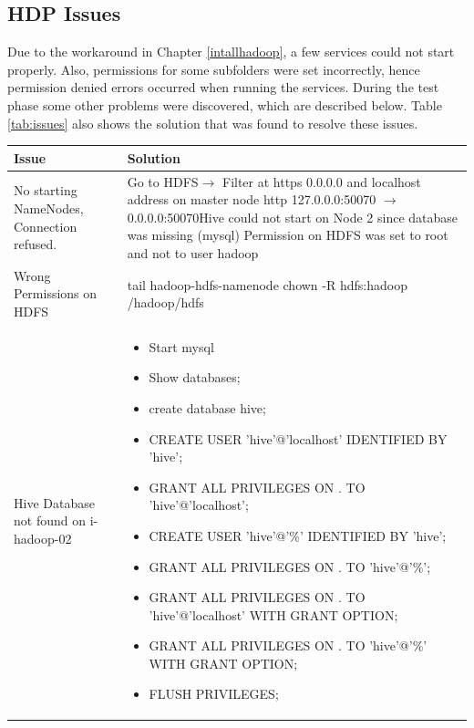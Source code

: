 \documentclass[12pt]{article}
\begin{document}
\subsection{HDP Issues}
Due to the workaround in Chapter \ref{intallhadoop}, a few services could not start properly. Also, permissions for some subfolders were set incorrectly, hence permission denied errors occurred when running the services. During the test phase some other problems were discovered, which are described below. Table \ref{tab:issues} also shows the solution that was found to resolve these issues.
\begin{table}[H]
\hspace{-2.0cm}
\begin{tabular}{|p{4.4cm}|p{12.4cm}|}
	\hline
	\textbf{Issue} & \textbf{Solution} \\ \hline
	No starting NameNodes, Connection
refused. & Go to HDFS$\rightarrow$ Filter at https
0.0.0.0 and \newline localhost address on master node \newline http
127.0.0.0:50070 $\rightarrow$ 0.0.0.0:50070\newline Hive could not start on Node 2 since database was missing (mysql) Permission on HDFS was set to root and not to user hadoop
\\ \hline
Wrong Permissions on HDFS & tail hadoop-hdfs-namenode\newline
chown -R hdfs:hadoop /hadoop/hdfs \\ \hline
Hive Database not found on i-hadoop-02 & \begin{itemize}[noitemsep,leftmargin=*] 
\item Start mysql
\item Show databases;
\item create database hive;
\item CREATE USER 'hive'@'localhost' IDENTIFIED BY 'hive';
\item GRANT ALL PRIVILEGES ON . TO 'hive'@'localhost';
\item CREATE USER 'hive'@'\%' IDENTIFIED BY 'hive';
\item GRANT ALL PRIVILEGES ON . TO 'hive'@'\%';
\item GRANT ALL PRIVILEGES ON . TO 'hive'@'localhost' WITH GRANT OPTION;
\item GRANT ALL PRIVILEGES ON . TO 'hive'@'\%' WITH GRANT OPTION;
\item FLUSH PRIVILEGES;
\end{itemize}
\\ \hline

\end{tabular}
\end{table}
\end{document}
